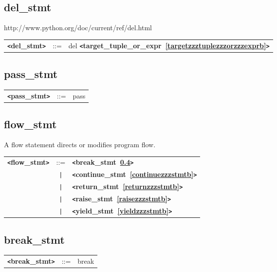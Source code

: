 \documentclass[12pt]{article}
\begin{document}
\subsection{del\_stmt}
\label{delzzzstmtb}
http://www.python.org/doc/current/ref/del.html

\begin{tabular}{lcl}
{\bf \verb+<+del\_stmt\verb+>+} & ::=  & del {\bf \verb+<+target\_tuple\_or\_expr~\ref{targetzzztuplezzzorzzzexprb}\verb+>+}  \\
\end{tabular}

\subsection{pass\_stmt}
\label{passzzzstmtb}
\begin{tabular}{lcl}
{\bf \verb+<+pass\_stmt\verb+>+} & ::=  & pass \\
\end{tabular}

\subsection{flow\_stmt}
\label{flowzzzstmtb}
A flow statement directs or modifies program flow. \\

\begin{tabular}{lcl}
{\bf \verb+<+flow\_stmt\verb+>+} & ::=  & {\bf \verb+<+break\_stmt~\ref{breakzzzstmtb}\verb+>+}  \\
 & \verb+|+  & {\bf \verb+<+continue\_stmt~\ref{continuezzzstmtb}\verb+>+}  \\
 & \verb+|+  & {\bf \verb+<+return\_stmt~\ref{returnzzzstmtb}\verb+>+}  \\
 & \verb+|+  & {\bf \verb+<+raise\_stmt~\ref{raisezzzstmtb}\verb+>+}  \\
 & \verb+|+  & {\bf \verb+<+yield\_stmt~\ref{yieldzzzstmtb}\verb+>+}  \\
\end{tabular}

\subsection{break\_stmt}
\label{breakzzzstmtb}
\begin{tabular}{lcl}
{\bf \verb+<+break\_stmt\verb+>+} & ::=  & break \\
\end{tabular} \\
\end{document}
